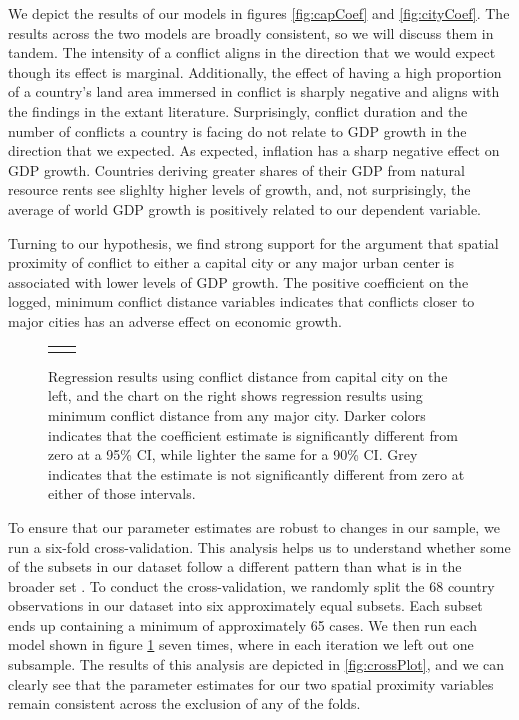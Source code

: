 We depict the results of our models in figures \ref{fig:capCoef} and \ref{fig:cityCoef}. The results across the two models are broadly consistent, so we will discuss them in tandem. The intensity of a conflict aligns in the direction that we would expect though its effect is marginal. Additionally, the effect of having a high proportion of a country's land area immersed in conflict is sharply negative and aligns with the findings in the extant literature. Surprisingly, conflict duration and the number of conflicts a country is facing do not relate to GDP growth in the direction that we expected. As expected, inflation has a sharp negative effect on GDP growth. Countries deriving greater shares of their GDP from natural resource rents see slighlty higher levels of growth, and, not surprisingly, the average of world GDP growth is positively related to our dependent variable.


Turning to our hypothesis, we find strong support for the argument that spatial proximity of conflict to either a capital city or any major urban center is associated with lower levels of GDP growth. The positive coefficient on the logged, minimum conflict distance variables indicates that conflicts closer to major cities has an adverse effect on economic growth. 

\begin{figure}
	\centering
	\begin{tabular}{cc}
		\subfloat[SubFigure 1][Capital City]{
			\resizebox{.45\textwidth}{!}{}
		\label{fig:capCoef}} &
		\subfloat[SubFigure 2][Any Major City]{
			\resizebox{.45\textwidth}{!}{}
		\label{fig:cityCoef}}
	\end{tabular}
	\caption{Regression results using conflict distance from capital city on the left, and the chart on the right shows regression results using minimum conflict distance from any major city. Darker colors indicates that the coefficient estimate is significantly different from zero at a 95\% CI, while lighter the same for a 90\% CI. Grey indicates that the estimate is not significantly different from zero at either of those intervals.}
	\label{fig:coefplot}
\end{figure}

To ensure that our parameter estimates are robust to changes in our sample, we run a six-fold cross-validation. This analysis helps us to understand whether some of the subsets in our dataset follow a different pattern than what is in the broader set \citep{beck2008time}. To conduct the cross-validation, we randomly split the 68 country observations in our dataset into six approximately equal subsets. Each subset ends up containing a minimum of approximately 65 cases. We then run each model shown in figure \ref{fig:coefplot} seven times, where in each iteration we left out one subsample. The results of this analysis are depicted in \ref{fig:crossPlot}, and we can clearly see that the parameter estimates for our two spatial proximity variables remain consistent across the exclusion of any of the folds.

